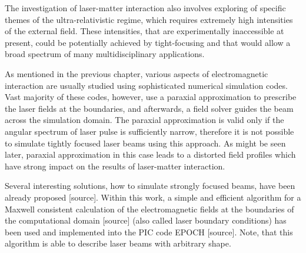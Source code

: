 The investigation of laser-matter interaction also involves exploring of specific themes of the ultra-relativistic regime, which requires extremely high intensities of the external field. These intensities, that are experimentally inaccessible at present, could be potentially achieved by tight-focusing and that would allow a broad spectrum of many multidisciplinary applications.

As mentioned in the previous chapter, various aspects of electromagnetic interaction are usually studied using sophisticated numerical simulation codes. Vast majority of these codes, however, use a paraxial approximation to prescribe the laser fields at the boundaries, and afterwards, a field solver guides the beam across the simulation domain. The paraxial approximation is valid only if the angular spectrum of laser pulse is sufficiently narrow, therefore it is not possible to simulate tightly focused laser beams using this approach. As might be seen later, paraxial approximation in this case leads to a distorted field profiles which have strong impact on the results of laser-matter interaction.

Several interesting solutions, how to simulate strongly focused beams, have been already proposed [source]. Within this work, a simple and efficient algorithm for a Maxwell consistent calculation of the electromagnetic fields at the boundaries of the computational domain [source] (also called laser boundary conditions) has been used and implemented into the PIC code EPOCH [source]. Note, that this algorithm is able to describe laser beams with arbitrary shape.

